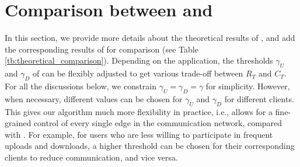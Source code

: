 \section{Comparison between \modelone{} and \modelbaseline{}} \label{sec:tb_theretical}
In this section, we provide more details about the theoretical results of \modelone{}, and add the corresponding results of \modelbaseline{} for comparison (see Table \ref{tb:theoretical_comparison}).
Depending on the application, the thresholds $\gamma_{U}$ and $\gamma_{D}$ of \modelone{} can be flexibly adjusted to get various trade-off between $R_{T}$ and $C_{T}$. For all the discussions below, we constrain $\gamma_{U}=\gamma_{D}=\gamma$ for simplicity. However, when necessary, different values can be chosen for $\gamma_{U}$ and $\gamma_{D}$ for different clients. This gives our algorithm much more flexibility in practice, i.e., allows for a fine-grained control of every single edge in the communication network, compared with \modelbaseline{}.
For example, for users who are less willing to participate in frequent uploads and downloads, a higher threshold can be chosen for their corresponding clients to reduce communication, and vice versa. 




